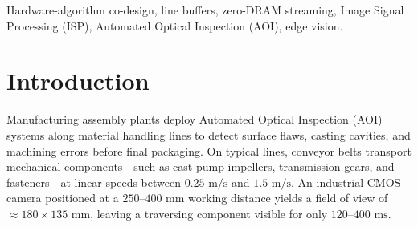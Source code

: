 \documentclass[conference]{IEEEtran}
\begin{document}
\begin{IEEEkeywords}
Hardware-algorithm co-design, line buffers, zero-DRAM streaming, Image Signal Processing (ISP), Automated Optical Inspection (AOI), edge vision.
\end{IEEEkeywords}

\section{Introduction}
\label{sec:intro}
Manufacturing assembly plants deploy Automated Optical Inspection (AOI) systems along material handling lines to detect surface flaws, casting cavities, and machining errors before final packaging. On typical lines, conveyor belts transport mechanical components—such as cast pump impellers, transmission gears, and fasteners—at linear speeds between $0.25\text{ m/s}$ and $1.5\text{ m/s}$. An industrial CMOS camera positioned at a $250\text{--}400\text{ mm}$ working distance yields a field of view of $\approx 180 \times 135\text{ mm}$, leaving a traversing component visible for only $120\text{--}400\text{ ms}$. 
\end{document}
